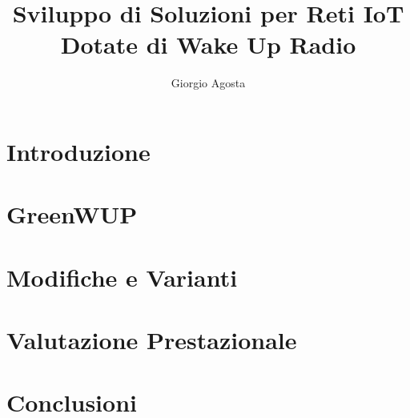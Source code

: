\documentclass[binding=0.6cm,TFA,noexaminfo]{sapthesis}
\title{Sviluppo di Soluzioni per Reti IoT\\ Dotate di Wake Up Radio}
\author{Giorgio Agosta}
\begin{document}
\frontmatter

\maketitle

\begin{acknowledgments}

\end{acknowledgments}

\tableofcontents

\mainmatter

\clearpage

\chapter{Introduzione}


\chapter{GreenWUP}


\chapter{Modifiche e Varianti}


\chapter{Valutazione Prestazionale}

\newpage

\newpage


\chapter{Conclusioni}




\end{document}
